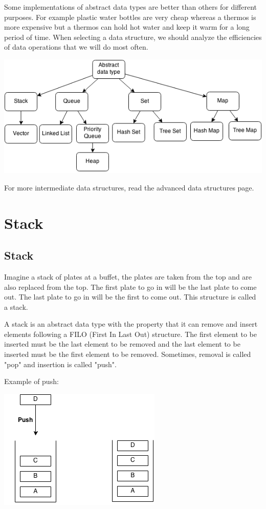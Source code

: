 \documentclass[11pt,oneside]{book}
\makeatletter
\def\maxwidth#1{\ifdim\Gin@nat@width>#1 #1\else\Gin@nat@width\fi}
\makeatother
\begin{document}
Some implementations of abstract data types are better than others for different purposes. For example plastic water bottles are very cheap whereas a thermos is more expensive but a thermos can hold hot water and keep it warm for a long period of time. When selecting a data structure, we should analyze the efficiencies of data operations that we will do most often.

\includegraphics[width=\maxwidth{\textwidth}]{adt.png}

For more intermediate data structures, read the advanced data structures page.


    \chapter{ Stack }
        \section{ Stack }
        

Imagine a stack of plates at a buffet, the plates are taken from the top and are also replaced from the top. The first plate to go in will be the last plate to come out. The last plate to go in will be the first to come out. This structure is called a stack.

A stack is an abstract data type with the property that it can remove and insert elements following a FILO (First In Last Out) structure. The first element to be inserted must be the last element to be removed and the last element to be inserted must be the first element to be removed. Sometimes, removal is called "pop" and insertion is called "push".

Example of push:

\includegraphics[width=\maxwidth{\textwidth}]{stack.png}
\end{document}
